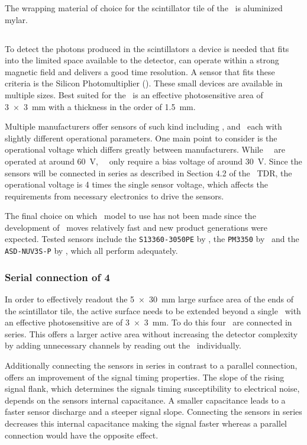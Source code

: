 \documentclass[../BTOF_summary.tex]{subfiles}
\begin{document}
The wrapping material of choice for the scintillator tile of the \btofD\ is aluminized mylar.


\subsection{\sipm}

To detect the photons produced in the scintillators a device is needed that fits into the limited space available to the detector, can operate within a strong magnetic field and delivers a good time resolution.
A sensor that fits these criteria is the Silicon Photomultiplier (\sipm ).
These small devices are available in multiple sizes.
Best suited for the \btofD\ is an effective photosensitive area of \SI{3x3}{mm} with a thickness in the order of \SI{1.5}{mm}.

Multiple manufacturers offer sensors of such kind including \hamamatsu, \ketek and \advansid\ each with slightly different operational parameters.
One main point to consider is the operational voltage which differs greatly between manufacturers.
While \hamamatsu\ \sipms\ are operated at around \SI{60}{V}, \ketek\ \sipms\ only require a bias voltage of around \SI{30}{V}.
Since the sensors will be connected in series as described in Section 4.2 of the \btof\ TDR, the operational voltage is 4 times the single sensor voltage, which affects the requirements from necessary electronics to drive the sensors.

The final choice on which \sipm\ model to use has not been made since the development of \sipms\ moves relatively fast and new product generations were expected.
Tested sensors include the \texttt{S13360-3050PE} by \hamamatsu, the \texttt{PM3350} by \ketek\ and the \texttt{ASD-NUV3S-P} by \advansid , which all perform adequately.

\subsubsection*{Serial connection of 4 \sipms}

In order to effectively readout the \SI{5x30}{mm} large surface area of the ends of the scintillator tile, the active surface needs to be extended beyond a single \sipm\ with an effective photosensitive are of \SI{3x3}{mm}.
To do this four \sipms\ are connected in series.
This offers a larger active area without increasing the detector complexity by adding unnecessary channels by reading out the \sipms\ individually.

Additionally connecting the sensors in series in contrast to a parallel connection, offers an improvement of the signal timing properties.
The slope of the rising signal flank, which determines the signals timing susceptibility to electrical noise, depends on the sensors internal capacitance.
A smaller capacitance leads to a faster sensor discharge and a steeper signal slope.
Connecting the sensors in series decreases this internal capacitance making the signal faster whereas a parallel connection would have the opposite effect.
\end{document}
